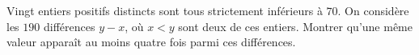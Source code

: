 Vingt entiers positifs distincts sont tous strictement inférieurs à $70$. On
considère les $190$ différences $y-x$, où $x<y$ sont deux de ces entiers.
Montrer qu'une même valeur apparaît au moins quatre fois parmi ces différences.
